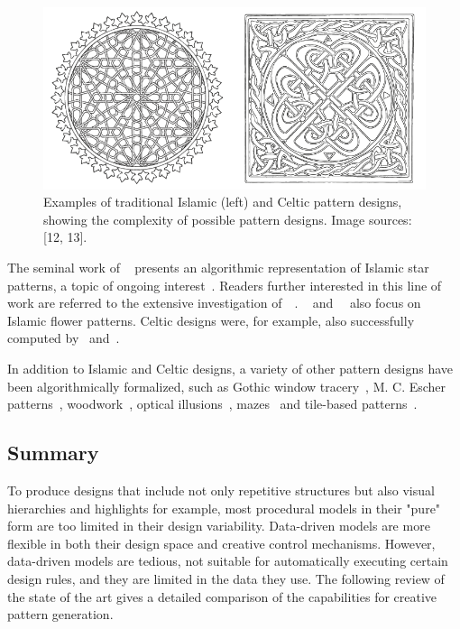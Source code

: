 \begin{figure}
\centering
    \includegraphics[width=0.9\columnwidth]{figures/islamic_celtic_ornament_01.png}
    \caption[Islamic and Celtic pattern designs]{Examples of traditional Islamic (left) and Celtic pattern designs, showing the complexity of possible pattern designs. Image sources: [12, 13]. }
\label{fig:islamic_celtic_ornament}
\end{figure}

The seminal work of \citeauthor*{kaplan_2004_isp}~\cite{kaplan_2004_isp} presents an algorithmic representation of Islamic star patterns, a topic of ongoing interest~\cite{khamjane_2018_giq}. Readers further interested in this line of work are referred to the extensive investigation of~\citeauthor*{kaplan_2002_cgg}~\cite{kaplan_2002_cgg}. \citeauthor*{etemad_2008_apf}~\cite{etemad_2008_apf} and~\citeauthor*{hamekasi_2012_dpf}~\cite{hamekasi_2012_dpf} also focus on Islamic flower patterns. Celtic designs were, for example, also successfully computed by~\citeauthor*{kaplan_2003_cgc} and~\cite{doyle_2013_ccc}.

In addition to Islamic and Celtic designs, a variety of other pattern designs have been algorithmically formalized, such as Gothic window tracery~\cite{havemann_2004_gpd}, M. C. Escher patterns~\cite{dunham_1981_crh,kaplan_2004_isp}, woodwork~\cite{gulati_2010_acp,gulati_2012_acp}, optical illusions~\cite{chi_2014_ois}, mazes~\cite{pedersen_2006_ola} and tile-based patterns~\cite{ouyang_2015_cat, gdawiec_2017_pga}.



\subsection{Summary}
\label{subsec:models_summary}

To produce designs that include not only repetitive structures but also visual hierarchies and highlights for example, most procedural models in their "pure" form are too limited in their design variability. Data-driven models are more flexible in both their design space and creative control mechanisms. However, data-driven models are tedious, not suitable for automatically executing certain design rules, and they are limited in the data they use. The following review of the state of the art gives a detailed comparison of the capabilities for creative pattern generation.